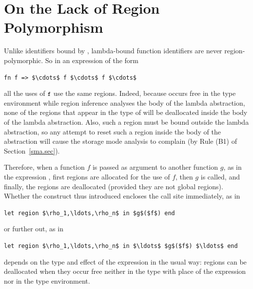 \documentclass[12pt]{book}
\begin{document}
\section{On the Lack of Region Polymorphism}

Unlike identifiers bound by , lambda-bound function identifiers are
never region-polymorphic. So in an expression of the form
\begin{center}
  \lstinline!fn f => $\cdots$ f $\cdots$ f $\cdots$!
\end{center}
all the uses of $\mbox{\small\ttfamily f}$ use the same regions. Indeed, because  occurs
free in the type environment while region inference analyses the body of the
lambda abstraction, none of the regions that appear in the type of  will
be deallocated inside the body of the lambda abstraction. Also, such a region
must be bound outside the lambda abstraction, so any attempt to reset such a
region inside the body of the abstraction will cause the storage mode analysis
to complain (by Rule (B1) of Section~\ref{sma.sec}).

Therefore, when a function $f$ is passed as argument to another function $g$, as
in the expression , first regions are allocated for the use of $f$,
then $g$ is called, and finally, the regions are deallocated (provided they are
not global regions).  Whether the  construct thus introduced
encloses the call site immediately, as in
\begin{center}
  \lstinline!let region $\rho_1,\ldots,\rho_n$ in $g$($f$) end!
\end{center}
or further out, as in
\begin{center}
  \lstinline!let region $\rho_1,\ldots,\rho_n$ in $\ldots$ $g$($f$) $\ldots$ end!
\end{center}
depends on the type and effect of the expression  in the usual way:
regions can be deallocated when they occur free neither in the type with place
of the expression nor in the type environment.
\end{document}
